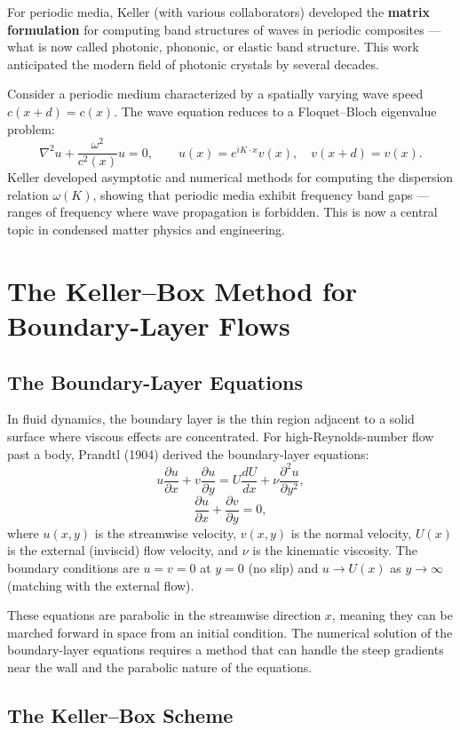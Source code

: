 For periodic media, Keller (with various collaborators) developed the \textbf{matrix formulation} for computing band structures of waves in periodic composites --- what is now called photonic, phononic, or elastic band structure. This work anticipated the modern field of photonic crystals by several decades.

Consider a periodic medium characterized by a spatially varying wave speed \(c(x + d) = c(x)\). The wave equation reduces to a Floquet--Bloch eigenvalue problem:
\[
\nabla^2 u + \frac{\omega^2}{c^2(x)} u = 0, \qquad u(x) = e^{i K \cdot x} v(x),\quad v(x+d) = v(x).
\]
Keller developed asymptotic and numerical methods for computing the dispersion relation \(\omega(K)\), showing that periodic media exhibit frequency band gaps --- ranges of frequency where wave propagation is forbidden. This is now a central topic in condensed matter physics and engineering.

\section{The Keller--Box Method for Boundary-Layer Flows}

\subsection{The Boundary-Layer Equations}

In fluid dynamics, the boundary layer is the thin region adjacent to a solid surface where viscous effects are concentrated. For high-Reynolds-number flow past a body, Prandtl (1904) derived the boundary-layer equations:
\[
u \frac{\partial u}{\partial x} + v \frac{\partial u}{\partial y} = U\frac{dU}{dx} + \nu \frac{\partial^2 u}{\partial y^2},
\]
\[
\frac{\partial u}{\partial x} + \frac{\partial v}{\partial y} = 0,
\]
where \(u(x, y)\) is the streamwise velocity, \(v(x, y)\) is the normal velocity, \(U(x)\) is the external (inviscid) flow velocity, and \(\nu\) is the kinematic viscosity. The boundary conditions are \(u = v = 0\) at \(y = 0\) (no slip) and \(u \to U(x)\) as \(y \to \infty\) (matching with the external flow).

These equations are parabolic in the streamwise direction \(x\), meaning they can be marched forward in space from an initial condition. The numerical solution of the boundary-layer equations requires a method that can handle the steep gradients near the wall and the parabolic nature of the equations.

\subsection{The Keller--Box Scheme}

